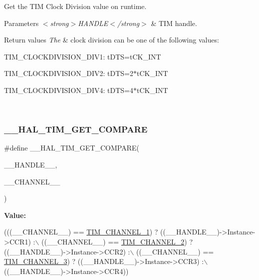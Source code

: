 Get the T\+IM Clock Division value on runtime. 


\begin{DoxyParams}{Parameters}
{\em $<$strong$>$\+H\+A\+N\+D\+L\+E$<$/strong$>$} & T\+IM handle. \\
\hline
\end{DoxyParams}

\begin{DoxyRetVals}{Return values}
{\em The} & clock division can be one of the following values\+: \begin{DoxyItemize}
\item T\+I\+M\+\_\+\+C\+L\+O\+C\+K\+D\+I\+V\+I\+S\+I\+O\+N\+\_\+\+D\+I\+V1\+: t\+D\+TS=t\+C\+K\+\_\+\+I\+NT \item T\+I\+M\+\_\+\+C\+L\+O\+C\+K\+D\+I\+V\+I\+S\+I\+O\+N\+\_\+\+D\+I\+V2\+: t\+D\+TS=2$\ast$t\+C\+K\+\_\+\+I\+NT \item T\+I\+M\+\_\+\+C\+L\+O\+C\+K\+D\+I\+V\+I\+S\+I\+O\+N\+\_\+\+D\+I\+V4\+: t\+D\+TS=4$\ast$t\+C\+K\+\_\+\+I\+NT \end{DoxyItemize}
\\
\hline
\end{DoxyRetVals}
\mbox{\label{group___t_i_m___exported___macros_gaa40722f56910966e1da5241b610eed84}} 
\subsubsection{\texorpdfstring{\+\_\+\+\_\+\+H\+A\+L\+\_\+\+T\+I\+M\+\_\+\+G\+E\+T\+\_\+\+C\+O\+M\+P\+A\+RE}{\_\_HAL\_TIM\_GET\_COMPARE}}
{\footnotesize\ttfamily \#define \+\_\+\+\_\+\+H\+A\+L\+\_\+\+T\+I\+M\+\_\+\+G\+E\+T\+\_\+\+C\+O\+M\+P\+A\+RE(\begin{DoxyParamCaption}\item[{}]{\+\_\+\+\_\+\+H\+A\+N\+D\+L\+E\+\_\+\+\_\+,  }\item[{}]{\+\_\+\+\_\+\+C\+H\+A\+N\+N\+E\+L\+\_\+\+\_\+ }\end{DoxyParamCaption})}

{\bfseries Value\+:}
\begin{DoxyCode}
(((\_\_CHANNEL\_\_) == \hyperlink{group___t_i_m___channel_ga6b1541e4a49d62610899e24bf23f4879}{TIM\_CHANNEL\_1}) ? ((\_\_HANDLE\_\_)->Instance->CCR1) :\(\backslash\)
 ((\_\_CHANNEL\_\_) == \hyperlink{group___t_i_m___channel_ga33e02d43345a7ac5886f01b39e4f7ccd}{TIM\_CHANNEL\_2}) ? ((\_\_HANDLE\_\_)->Instance->CCR2) :\(\backslash\)
 ((\_\_CHANNEL\_\_) == \hyperlink{group___t_i_m___channel_ga4ea100c1789b178f3cb46721b7257e2d}{TIM\_CHANNEL\_3}) ? ((\_\_HANDLE\_\_)->Instance->CCR3) :\(\backslash\)
 ((\_\_HANDLE\_\_)->Instance->CCR4))
\end{DoxyCode}


